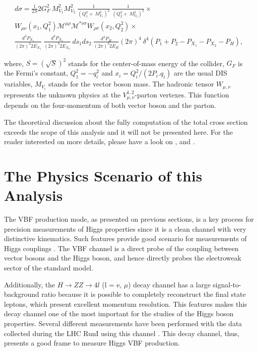 \begin{eqnarray}
\nonumber
d\sigma = \frac{1}{2S}2G_{F}^{2}~M_{V_{1}}^{2}M_{V_{2}}^{2}~\frac{1}{(Q_{1}^{2}+~M_{V_{1}}^{2})^{2}}~\frac{1}{(Q_{2}^{2}+~M_{V_{2}}^{2})^{2}}\times\\
\nonumber
W_{\mu\nu}(x_{1},Q_{1}^{2})\mathcal{M}^{\mu\rho}\mathcal{M}^{*\nu\sigma}W_{\rho\sigma}(x_{2},Q_{2}^{2})\times\\ \frac{d^{3}P_{X_{1}}}{(2\pi)^{3}2E_{X_{1}}}~\frac{d^{3}P_{X_{2}}}{(2\pi)^{3}2E_{X_{2}}}~ds_{1}ds_{2}~\frac{d^{3}P_{H}}{(2\pi)^{3}2E_{H}}
(2\pi)^{4}~\delta^{4}(P_{1}+P_{2}-P_{X_{1}}-P_{X_{2}}-P_{H}),
\label{eq:vbf_dis_differential_XS}
\end{eqnarray}

where, $S=(\sqrt{S})^{2}$ stands for the center-of-mass energy of the collider, $G_{F}$ is the Fermi's constant, $Q_{1}^{2} = -q_{i}^{2}$ and $x_{i} = Q_{i}^{2}/(2P_{i}.q_{i})$ are the usual DIS variables, $M_{V_{i}}$ stands for the vector boson mass. The hadronic tensor $W_{\mu,\nu}$ represents the unknown physics at the $V_{\mu,\nu}^{1,2}$-parton vertexes. This function depends on the four-momentum of both vector boson and the parton. 

The theoretical discussion about the fully computation of the total cross section exceeds the scope of this analysis and it will not be presented here. For the reader interested on more details, please have a look on \cite{bib:PhysRep457-1-2005}, \cite{bib:PhysRevLett105-011801-2010} and \cite{bib:PhysRevLett69-3274-1992}.


\section{The Physics Scenario of this Analysis}
The VBF production mode, as presented on previous sections, is a key process for precision measurements of Higgs properties since it is a clean channel with very distinctive kinematics. Such features provide good scenario for measurements of Higgs couplings \cite{bib:PhysRevD62_013009_2000}. The VBF channel is a direct probe of the coupling between vector bosons and the Higgs boson, and hence directly probes the electroweak sector of the standard model.

Additionally, the $H \rightarrow ZZ \rightarrow 4l$ (l = e, $\mu$) decay channel has a large signal-to-background ratio because it is possible to completely reconstruct the final state leptons, which present excellent momentum resolution. This features makes this decay channel one of the most important for the studies of the Higgs boson properties. Several different measurements have been performed with the data collected during the LHC RunI using this channel
\cite{bib:PhysRevLett110-081803-2013,bib:PhysRevD89-092007-2014,bib:PhysLettB-736-64-2014,bib:PhysRevD92-012004-2015,bib:PhysRevD92-072010-2015}. This decay channel, thus, presents a good frame to measure Higgs VBF production.

